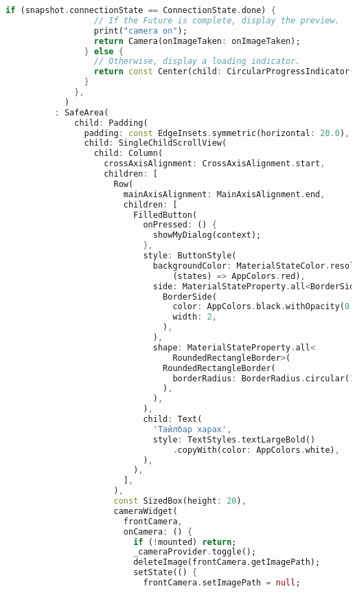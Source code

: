 \begin{lstlisting}[language=Dart, caption=Data Spider нүүр хуудасны хэрэгжүүлэлт, frame=single]
                if (snapshot.connectionState == ConnectionState.done) {
                  // If the Future is complete, display the preview.
                  print("camera on");
                  return Camera(onImageTaken: onImageTaken);
                } else {
                  // Otherwise, display a loading indicator.
                  return const Center(child: CircularProgressIndicator());
                }
              },
            )
          : SafeArea(
              child: Padding(
                padding: const EdgeInsets.symmetric(horizontal: 20.0),
                child: SingleChildScrollView(
                  child: Column(
                    crossAxisAlignment: CrossAxisAlignment.start,
                    children: [
                      Row(
                        mainAxisAlignment: MainAxisAlignment.end,
                        children: [
                          FilledButton(
                            onPressed: () {
                              showMyDialog(context);
                            },
                            style: ButtonStyle(
                              backgroundColor: MaterialStateColor.resolveWith(
                                  (states) => AppColors.red),
                              side: MaterialStateProperty.all<BorderSide>(
                                BorderSide(
                                  color: AppColors.black.withOpacity(0.1),
                                  width: 2,
                                ),
                              ),
                              shape: MaterialStateProperty.all<
                                  RoundedRectangleBorder>(
                                RoundedRectangleBorder(
                                  borderRadius: BorderRadius.circular(10.0),
                                ),
                              ),
                            ),
                            child: Text(
                              'Тайлбар харах',
                              style: TextStyles.textLargeBold()
                                  .copyWith(color: AppColors.white),
                            ),
                          ),
                        ],
                      ),
                      const SizedBox(height: 20),
                      cameraWidget(
                        frontCamera,
                        onCamera: () {
                          if (!mounted) return;
                          _cameraProvider.toggle();
                          deleteImage(frontCamera.getImagePath);
                          setState(() {
                            frontCamera.setImagePath = null;

\end{lstlisting}
